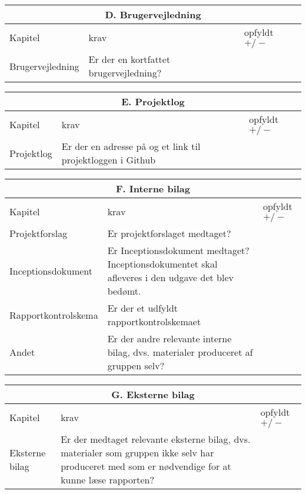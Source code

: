 \begin{center}
\begin{longtable}{|m{3.5cm}|m{10cm}|m{2.5cm}|}
\hline
\multicolumn{3}{|c|}{D. Brugervejledning} \\ \hline
Kapitel & krav & opfyldt $+/-$ \\ \hline
Brugervejledning & Er der en kortfattet brugervejledning? & \\ \hline

\end{longtable}
\end{center}

\begin{center}
\begin{longtable}{|m{3.5cm}|m{10cm}|m{2.5cm}|}
\hline
\multicolumn{3}{|c|}{E. Projektlog} \\ \hline
Kapitel & krav & opfyldt $+/-$ \\ \hline
Projektlog & Er der en adresse på og et link til projektloggen i Github & \\ \hline
\end{longtable}
\end{center}

\begin{center}
\begin{longtable}{|m{3.5cm}|m{10cm}|m{2.5cm}|}
\hline
\multicolumn{3}{|c|}{F. Interne bilag} \\ \hline
Kapitel & krav & opfyldt $+/-$ \\ \hline
Projektforslag & Er projektforslaget medtaget? & \\ \hline
Inceptionsdokument & Er Inceptionsdokument medtaget? Inceptionsdokumentet skal afleveres i den udgave det blev bedømt. & \\  \hline
Rapportkontrolskema & Er der et udfyldt rapportkontrolskemaet & \\ \hline
Andet & Er der andre relevante interne bilag, dvs. materialer produceret af gruppen selv? & \\ \hline
\end{longtable}
\end{center}

\begin{center}
\begin{longtable}{|m{3.5cm}|m{10cm}|m{2.5cm}|}
\hline
\multicolumn{3}{|c|}{G. Eksterne bilag} \\ \hline
Kapitel & krav & opfyldt $+/-$ \\ \hline
Eksterne bilag & 
Er der medtaget relevante eksterne bilag, dvs. materialer som gruppen ikke selv har produceret med som er nødvendige for at kunne læse rapporten? & \\ 
\hline
\end{longtable}
\end{center}

